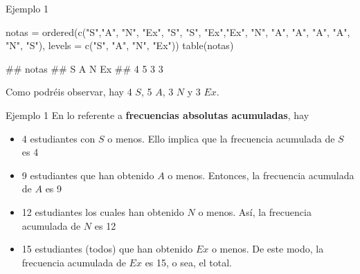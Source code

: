 \documentclass[
  ignorenonframetext,
  aspectratio=169]{beamer}
\newenvironment{Shaded}{\begin{snugshade}}{\end{snugshade}}
\newcommand{\AttributeTok}[1]{\textcolor[rgb]{0.77,0.63,0.00}{#1}}
\newcommand{\FunctionTok}[1]{\textcolor[rgb]{0.00,0.00,0.00}{#1}}
\newcommand{\NormalTok}[1]{#1}
\newcommand{\OtherTok}[1]{\textcolor[rgb]{0.56,0.35,0.01}{#1}}
\newcommand{\StringTok}[1]{\textcolor[rgb]{0.31,0.60,0.02}{#1}}
\providecommand{\tightlist}{%
  \setlength{\itemsep}{0pt}\setlength{\parskip}{0pt}}
\let\oldverbatim\verbatim
\let\endoldverbatim\endverbatim
\renewenvironment{verbatim}{\tiny\oldverbatim}{\endoldverbatim}
\begin{document}
\begin{frame}[fragile]{Ejemplo 1}
\protect\hypertarget{ejemplo-1-1}{}
\begin{Shaded}
\begin{Highlighting}[]
\NormalTok{notas }\OtherTok{=} \FunctionTok{ordered}\NormalTok{(}\FunctionTok{c}\NormalTok{(}\StringTok{"S"}\NormalTok{,}\StringTok{"A"}\NormalTok{, }\StringTok{"N"}\NormalTok{, }\StringTok{"Ex"}\NormalTok{, }\StringTok{"S"}\NormalTok{, }\StringTok{"S"}\NormalTok{,}
                  \StringTok{"Ex"}\NormalTok{,}\StringTok{"Ex"}\NormalTok{, }\StringTok{"N"}\NormalTok{, }\StringTok{"A"}\NormalTok{, }\StringTok{"A"}\NormalTok{, }\StringTok{"A"}\NormalTok{,}
                  \StringTok{"A"}\NormalTok{, }\StringTok{"N"}\NormalTok{, }\StringTok{"S"}\NormalTok{),}
                \AttributeTok{levels =} \FunctionTok{c}\NormalTok{(}\StringTok{"S"}\NormalTok{, }\StringTok{"A"}\NormalTok{, }\StringTok{"N"}\NormalTok{, }\StringTok{"Ex"}\NormalTok{))}
\FunctionTok{table}\NormalTok{(notas)}
\end{Highlighting}
\end{Shaded}

\begin{verbatim}
## notas
##  S  A  N Ex 
##  4  5  3  3
\end{verbatim}

Como podréis observar, hay 4 \(S\), 5 \(A\), 3 \(N\) y 3 \(Ex\).
\end{frame}

\begin{frame}{Ejemplo 1}
\protect\hypertarget{ejemplo-1-2}{}
En lo referente a \textbf{frecuencias absolutas acumuladas}, hay

\begin{itemize}
\tightlist
\item
  4 estudiantes con \(S\) o menos. Ello implica que la frecuencia
  acumulada de \(S\) es 4
\item
  9 estudiantes que han obtenido \(A\) o menos. Entonces, la frecuencia
  acumulada de \(A\) es 9
\item
  12 estudiantes los cuales han obtenido \(N\) o menos. Así, la
  frecuencia acumulada de \(N\) es 12
\item
  15 estudiantes (todos) que han obtenido \(Ex\) o menos. De este modo,
  la frecuencia acumulada de \(Ex\) es 15, o sea, el total.
\end{itemize}
\end{frame}
\end{document}
